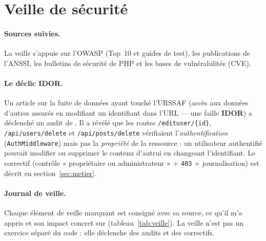 \section{Veille de sécurité}
\label{sec:veille}

\paragraph{Sources suivies.} La veille s'appuie sur l'OWASP (Top~10 et guides de test), les
publications de l'ANSSI, les bulletins de sécurité de PHP et les bases de vulnérabilités (CVE).

\paragraph{Le déclic IDOR.} Un article sur la fuite de données ayant touché l'URSSAF (accès aux
données d'autres assurés en modifiant un identifiant dans l'URL — une faille \textbf{IDOR}) a
déclenché un audit de \projet{}. Il a révélé que les routes \texttt{/edituser/\{id\}},
\texttt{/api/users/delete} et \texttt{/api/posts/delete} vérifiaient l'\emph{authentification}
(\texttt{AuthMiddleware}) mais pas la \emph{propriété} de la ressource : un utilisateur
authentifié pouvait modifier ou supprimer le contenu d'autrui en changeant l'identifiant. Le
correctif (contrôle « propriétaire ou administrateur » + \texttt{403} + journalisation) est
décrit en section~\ref{sec:metier}.

\paragraph{Journal de veille.} Chaque élément de veille marquant est consigné avec sa source, ce
qu'il m'a appris et son impact concret sur \projet{} (tableau~\ref{tab:veille}). La veille n'est
pas un exercice séparé du code : elle déclenche des audits et des correctifs.

